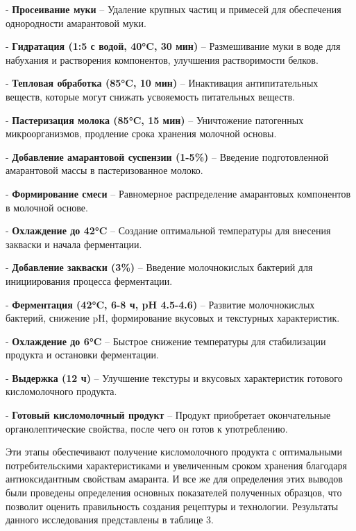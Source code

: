 \begin{multicols}{2}
- {\bfseries Просеивание муки} -- Удаление крупных частиц и примесей для обеспечения
однородности амарантовой муки.

- {\bfseries Гидратация (1:5 с водой, 40°C, 30 мин)} -- Размешивание муки в
воде для набухания и растворения компонентов, улучшения растворимости белков.

- {\bfseries Тепловая обработка (85°C, 10 мин)} -- Инактивация
антипитательных веществ, которые могут снижать усвояемость питательных веществ.

- {\bfseries Пастеризация молока (85°C, 15 мин)} -- Уничтожение патогенных
микроорганизмов, продление срока хранения молочной основы.

- {\bfseries Добавление амарантовой суспензии (1-5\%)} -- Введение
подготовленной амарантовой массы в пастеризованное молоко.

- {\bfseries Формирование смеси} -- Равномерное распределение амарантовых
компонентов в молочной основе.

- {\bfseries Охлаждение до 42°C} -- Создание оптимальной температуры для
внесения закваски и начала ферментации.

- {\bfseries Добавление закваски (3\%)} -- Введение молочнокислых бактерий
для инициирования процесса ферментации.

- {\bfseries Ферментация (42°C, 6-8 ч, pH 4.5-4.6)} -- Развитие
молочнокислых бактерий, снижение pH, формирование вкусовых и текстурных характеристик.

- {\bfseries Охлаждение до 6°C} -- Быстрое снижение температуры для
стабилизации продукта и остановки ферментации.

- {\bfseries Выдержка (12 ч)} -- Улучшение текстуры и вкусовых
характеристик готового кисломолочного продукта.

- {\bfseries Готовый кисломолочный продукт} -- Продукт приобретает
окончательные органолептические свойства, после чего он готов к употреблению.

Эти этапы обеспечивают получение кисломолочного продукта с оптимальными
потребительскими характеристиками и увеличенным сроком хранения
благодаря антиоксидантным свойствам амаранта. И все же для определения
этих выводов были проведены определения основных показателей полученных
образцов, что позволит оценить правильность создания рецептуры и
технологии. Результаты данного исследования представлены в таблице 3.
\end{multicols}

